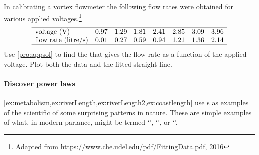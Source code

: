 \begin{OmitV1}
\begin{exercise}  
In calibrating a vortex flowmeter the following flow rates were obtained for various applied voltages.\footnote{Adapted from \url{https://www.che.udel.edu/pdf/FittingData.pdf}, 2016}
\setbox\ajrqrbox\hbox{}%
\marginajrbox%
\begin{equation*}
\begin{array}{lrrrrrrrr}\hline
\text{voltage (V)}&0.97&1.29&1.81&2.41&2.85&3.09&3.96\\
\text{flow rate (litre/s)}&0.01&0.27&0.59&0.94&1.21&1.36&2.14\\\hline
\end{array}
\end{equation*}
Use \cref{pro:appsol} to find the  that gives the flow rate as a function of the applied voltage.
Plot both the data and the fitted straight line.
\end{exercise}
\end{OmitV1}





\paragraph{Discover power laws}
\cref{ex:metabolism,ex:riverLength,ex:riverLength2,ex:coastlength} use s as examples of the scientific  of some surprising patterns in nature.  
These are simple examples of what, in modern parlance, might be termed `', `', or `'.



